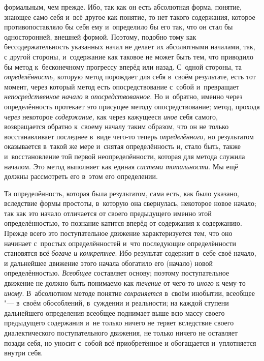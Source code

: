 формальным, чем прежде. Ибо, так как он есть абсолютная форма, понятие,
знающее само себя и~всё другое как понятие, то нет такого содержания,
которое противопоставляло бы себя ему и~определило бы его так, что он стал
бы односторонней, внешней формой. Поэтому, подобно тому как
бессодержательность указанных начал не делает их абсолютными началами, так,
с другой стороны, и~содержание как таковое не может быть
тем, что приводило бы метод к~бесконечному прогрессу вперёд или назад.
С~одной стороны, та {\em определённость,}
которую метод порождает для себя в~своём результате, есть тот
момент, через который метод есть опосредствование с~собой и~превращает
{\em непосредственное начало} в {\em опосредствованное}.
Но и~обратно, именно через определённость протекает это
присущее методу опосредствование; метод, проходя
{\em через} некоторое {\em содержание,} как через кажущееся {\em иное}
себя самого, возвращается обратно к~своему началу таким
образом, что он не только восстанавливает последнее в~виде чего-то теперь
{\em определённого,} но
результатом оказывается в~такой же мере и~снятая определённость и, стало
быть, также и~восстановление той первой неопределённости, которая для
метода служила началом. Это метод выполняет как единая
{\em система тотальности}.
Мы ещё должны рассмотреть его в~этом его определении.

Та определённость, которая была результатом, сама есть, как
было указано, вследствие формы простоты, в~которую она свернулась,
некоторое новое начало; так как это начало отличается от своего предыдущего
именно этой определённостью, то познание катится вперёд от содержания к
содержанию. Прежде всего это поступательное движение характеризуется тем,
что оно начинает с~простых определённостей и~что последующие определённости
становятся всё {\em богаче и
конкретнее}. Ибо результат содержит в~себе своё начало, и
дальнейшее движение этого начала обогатило его (начало) новой
определённостью. {\em Всеобщее}
составляет основу; поэтому поступательное движение не должно
быть понимаемо как {\em течение} от чего-то {\em иного} к
чему-то {\em иному}. В~абсолютном методе понятие {\em сохраняется} в~своём
инобытии, всеобщее "--- в~своём обособлений, в~суждении и
реальности; на каждой ступени дальнейшего определения всеобщее поднимает
выше всю массу своего предыдущего содержания и~не только ничего не теряет
вследствие своего диалектического поступательного движения, не только
ничего не оставляет позади себя, но уносит с~собой всё приобретённое и
обогащается и~уплотняется внутри себя.

